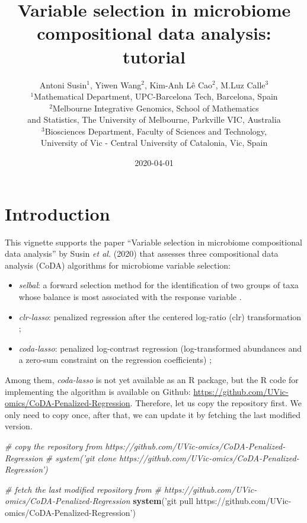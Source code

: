 \documentclass[openany]{book}
\title{Variable selection in microbiome compositional data analysis: tutorial}
\author{Antoni Susin\(^1\), Yiwen Wang\(^2\), Kim-Anh Lê Cao\(^2\), M.Luz
Calle\(^3\)\\[2\baselineskip]\(^1\)Mathematical Department,
UPC-Barcelona Tech, Barcelona, Spain\\
\(^2\)Melbourne Integrative Genomics, School of Mathematics\\
and Statistics, The University of Melbourne, Parkville VIC, Australia\\
\(^3\)Biosciences Department, Faculty of Sciences and Technology,\\
University of Vic - Central University of Catalonia, Vic, Spain}
\date{2020-04-01}
\newenvironment{Shaded}{\begin{snugshade}}{\end{snugshade}}
\newcommand{\KeywordTok}[1]{\textcolor[rgb]{0.13,0.29,0.53}{\textbf{#1}}}
\newcommand{\StringTok}[1]{\textcolor[rgb]{0.31,0.60,0.02}{#1}}
\newcommand{\CommentTok}[1]{\textcolor[rgb]{0.56,0.35,0.01}{\textit{#1}}}
\newcommand{\NormalTok}[1]{#1}
\providecommand{\tightlist}{%
  \setlength{\itemsep}{0pt}\setlength{\parskip}{0pt}}
\begin{document}
\maketitle

{
\hypersetup{linkcolor=black}
\setcounter{tocdepth}{3}
\tableofcontents
}
\chapter{Introduction}\label{introduction}

This vignette supports the paper ``Variable selection in microbiome
compositional data analysis'' by Susin \emph{et al.} (2020) that
assesses three compositional data analysis (CoDA) algorithms for
microbiome variable selection:

\begin{itemize}
\tightlist
\item
  \emph{selbal}: a forward selection method for the identification of
  two groups of taxa whose balance is most associated with the response
  variable \citep{rivera2018balances}.
\item
  \emph{clr-lasso}: penalized regression after the centered log-ratio
  (clr) transformation
  \citep{zou2005regularization, tibshirani1996regression, le1992ridge};
\item
  \emph{coda-lasso}: penalized log-contrast regression (log-transformed
  abundances and a zero-sum constraint on the regression coefficients)
  \citep{lu2019generalized, lin2014variable};
\end{itemize}

Among them, \emph{coda-lasso} is not yet available as an R package, but
the R code for implementing the algorithm is available on Github:
\url{https://github.com/UVic-omics/CoDA-Penalized-Regression}.
Therefore, let us copy the repository first. We only need to copy once,
after that, we can update it by fetching the last modified version.

\begin{Shaded}
\begin{Highlighting}[]
\CommentTok{# copy the repository from https://github.com/UVic-omics/CoDA-Penalized-Regression}
\CommentTok{# system('git clone https://github.com/UVic-omics/CoDA-Penalized-Regression')}

\CommentTok{# fetch the last modified repository from }
\CommentTok{# https://github.com/UVic-omics/CoDA-Penalized-Regression}
\KeywordTok{system}\NormalTok{(}\StringTok{'git pull https://github.com/UVic-omics/CoDA-Penalized-Regression'}\NormalTok{)}
\end{Highlighting}
\end{Shaded}
\end{document}
